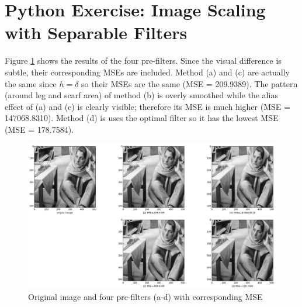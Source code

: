 \newpage

\section{Python Exercise: Image Scaling with Separable Filters}\label{sec:p7}

Figure \ref{fig:p7} shows the results of the four pre-filters. Since the visual difference is subtle, their corresponding MSEs are included. Method (a) and (c) are actually the same since $h = \delta$ so their MSEs are the same (MSE = 209.9389). The pattern (around leg and scarf area) of method (b) is overly smoothed while the alias effect of (a) and (c) is clearly visible; therefore its MSE is much higher (MSE = 147068.8310). Method (d) is uses the optimal filter so it has the lowest MSE (MSE = 178.7584).

\begin{figure}[htbp]
	\centering
	\includegraphics[width=\textwidth]{images/p7}
	\caption{Original image and four pre-filters (a-d) with corresponding MSE}
	\label{fig:p7}
\end{figure}